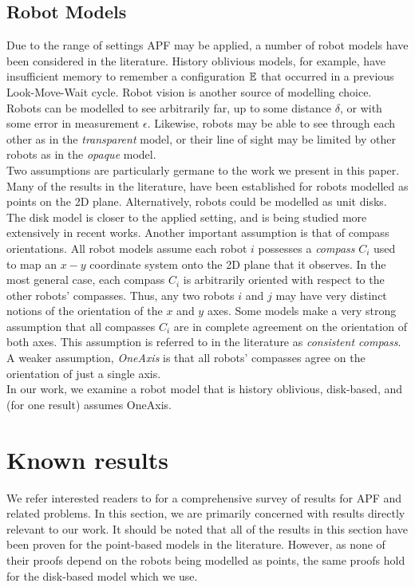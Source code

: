 \documentclass[preprint,10pt]{elsarticle}
\begin{document}
\subsection{Robot Models} 
\label{models}
Due to the range of settings APF may be applied, a number of robot models have been considered 
in the literature. History oblivious models, for example, have insufficient memory to remember
a configuration $\mathbb{E}$ that occurred in a previous Look-Move-Wait cycle. Robot vision is another 
source of modelling choice. Robots can be modelled to see arbitrarily far, up to some distance $\delta$, or
with some error in measurement $\epsilon$. Likewise, robots may be able to see through each other as in the 
\textit{transparent} model, or their line of sight may be limited by other robots as in the \textit{opaque}
model. \\

Two assumptions are particularly germane to the work we present in this paper. Many of the results in 
the literature, have been established for robots modelled as points on the 2D plane. Alternatively,
robots could be modelled as unit disks. The disk model is closer to the applied setting, and is being
studied more extensively in recent works. Another important assumption is that of compass orientations.
All robot models assume each robot $i$ possesses a \textit{compass} $C_i$ used to map an $x-y$ coordinate system
onto the 2D plane that it observes. In the most general case, each compass $C_i$ is arbitrarily oriented with
respect to the other robots' compasses. Thus, any two robots $i$ and $j$ may have very distinct notions
of the orientation of the $x$ and $y$ axes. Some models make a very strong assumption that all compasses $C_i$ 
are in complete agreement on the orientation of both axes. This assumption is referred to in the 
literature as \textit{consistent compass}. A weaker assumption, \textit{OneAxis} is 
that all robots' compasses agree on the orientation of just a single axis. \\%

In our work, we examine a robot model that is history oblivious, disk-based, and (for one result) assumes OneAxis.


\section{Known results}
	\label{prevWork}
	We refer interested readers to \cite{flocchini12distrib} for a comprehensive survey of results for
	APF and related problems. In this section, we are primarily concerned with results directly relevant
	to our work. It should be noted that all of the results in this section have been proven for 
	the point-based models in the literature. However, as none of their proofs depend on the robots
	being modelled as points, the same proofs hold for the disk-based model which we use.\\
\end{document}
